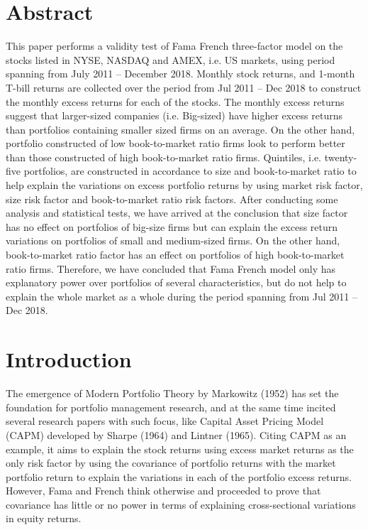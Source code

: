 \documentclass[12pt]{article}
\begin{document}
		\section{Abstract} %
	
	This paper performs a validity test of Fama French three-factor model on the stocks listed in NYSE, NASDAQ and AMEX, i.e. US markets, using period spanning from July 2011 – December 2018. Monthly stock returns, and 1-month T-bill returns are collected over the period from Jul 2011 – Dec 2018 to construct the monthly excess returns for each of the stocks. The monthly excess returns suggest that larger-sized companies (i.e. Big-sized) have higher excess returns than portfolios containing smaller sized firms on an average. On the other hand, portfolio constructed of low book-to-market ratio firms look to perform better than those constructed of high book-to-market ratio firms. Quintiles, i.e. twenty-five portfolios, are constructed in accordance to size and book-to-market ratio to help explain the variations on excess portfolio returns by using market risk factor, size risk factor and book-to-market ratio risk factors. After conducting some analysis and statistical tests, we have arrived at the conclusion that size factor has no effect on portfolios of big-size firms but can explain the excess return variations on portfolios of small and medium-sized firms. On the other hand, book-to-market ratio factor has an effect on portfolios of high book-to-market ratio firms. Therefore, we have concluded that Fama French model only has explanatory power over portfolios of several characteristics, but do not help to explain the whole market as a whole during the period spanning from Jul 2011 – Dec 2018.
	
	
	\section{Introduction} %
	
	The emergence of Modern Portfolio Theory by Markowitz (1952) has set the foundation for portfolio management research, and at the same time incited several research papers with such focus, like Capital Asset Pricing Model (CAPM) developed by Sharpe (1964) and Lintner (1965). Citing CAPM as an example, it aims to explain the stock returns using excess market returns as the only risk factor by using the covariance of portfolio returns with the market portfolio return to explain the variations in each of the portfolio excess returns. However, Fama and French think otherwise and proceeded to prove that covariance has little or no power in terms of explaining cross-sectional variations in equity returns. \\
	
\end{document}
